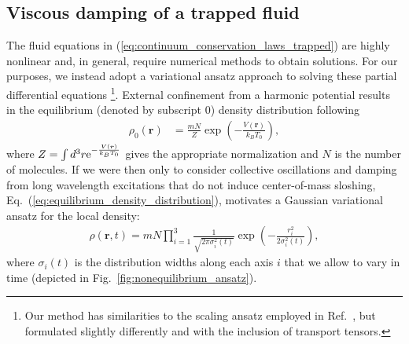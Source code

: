 \documentclass[reprint, amsmath, amssymb, aps, superscriptaddress]{revtex4-1}
\begin{document}
\subsection{ Viscous damping of a trapped fluid \label{sec:variational_ansatz_method} }



The fluid equations in (\ref{eq:continuum_conservation_laws_trapped}) are highly nonlinear and, in general, require numerical methods to obtain solutions.
For our purposes, we instead adopt a variational ansatz approach to solving these partial differential equations \footnote{
Our method has similarities to the scaling ansatz employed in Ref.~\cite{Kagan97_PRA, Pedri03_PRA, Wachtler17_PRA}, but formulated slightly differently and with the inclusion of transport tensors. 
}.
External confinement from a harmonic potential results in the equilibrium (denoted by subscript $0$) density distribution following
\begin{align} \label{eq:equilibrium_density_distribution}
    \rho_0(\boldsymbol{r})
    &=
    \frac{ m N }{ Z }
    \exp( -\frac{ V(\boldsymbol{r}) }{ k_B T_0 } ),
\end{align}
where $Z = \int d^3 r {\rm e}^{ -\frac{ V(\boldsymbol{r}) }{ k_B T_0 } }$ gives the appropriate normalization and $N$ is the number of molecules.
If we were then only to consider collective oscillations and damping from long wavelength excitations that do not induce center-of-mass sloshing, Eq.~(\ref{eq:equilibrium_density_distribution}), motivates a Gaussian variational ansatz for the local density:
\begin{align} \label{eq:Gaussian_density_ansatz}
    \rho(\boldsymbol{r}, t)
    =
    m N
    \prod_{i=1}^3
    \frac{ 1 }{ \sqrt{ 2 \pi \sigma_i^2(t) } }
    \exp\left(
    -\frac{ r_i^2 }{ 2 \sigma_i^2(t) }
    \right),
\end{align}
where $\sigma_i(t)$ is the distribution widths along each axis $i$ that we allow to vary in time (depicted in Fig.~\ref{fig:nonequilibrium_ansatz}).
\end{document}
